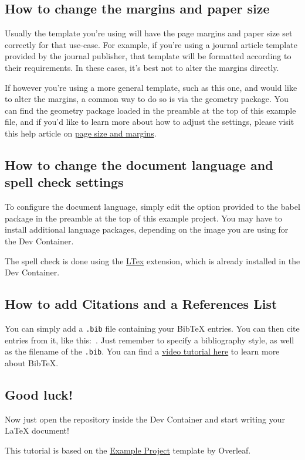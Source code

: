 \documentclass{article}
\begin{document}
\subsection{How to change the margins and paper size}

Usually the template you're using will have the page margins and paper size set correctly for that use-case. For example, if you're using a journal article template provided by the journal publisher, that template will be formatted according to their requirements. In these cases, it's best not to alter the margins directly.

If however you're using a more general template, such as this one, and would like to alter the margins, a common way to do so is via the geometry package. You can find the geometry package loaded in the preamble at the top of this example file, and if you'd like to learn more about how to adjust the settings, please visit this help article on \href{https://www.overleaf.com/learn/latex/page_size_and_margins}{page size and margins}.

\subsection{How to change the document language and spell check settings}

To configure the document language, simply edit the option provided to the babel package in the preamble at the top of this example project. You may have to install additional language packages, depending on the image you are using for the Dev Container.

The spell check is done using the \href{https://marketplace.visualstudio.com/items?itemName=valentjn.vscode-ltex}{LTex} extension, which is already installed in the Dev Container.

\subsection{How to add Citations and a References List}

You can simply add a \verb|.bib| file containing your BibTeX entries. You can then cite entries from it, like this:~\cite{greenwade93}. Just remember to specify a bibliography style, as well as the filename of the \verb|.bib|. You can find a \href{https://www.overleaf.com/help/97-how-to-include-a-bibliography-using-bibtex}{video tutorial here} to learn more about BibTeX.

\subsection{Good luck!}

Now just open the repository inside the Dev Container and start writing your LaTeX document!

This tutorial is based on the \href{https://www.overleaf.com/latex/templates/example-project/qzykddzqhkwk}{Example Project} template by Overleaf.



\end{document}

